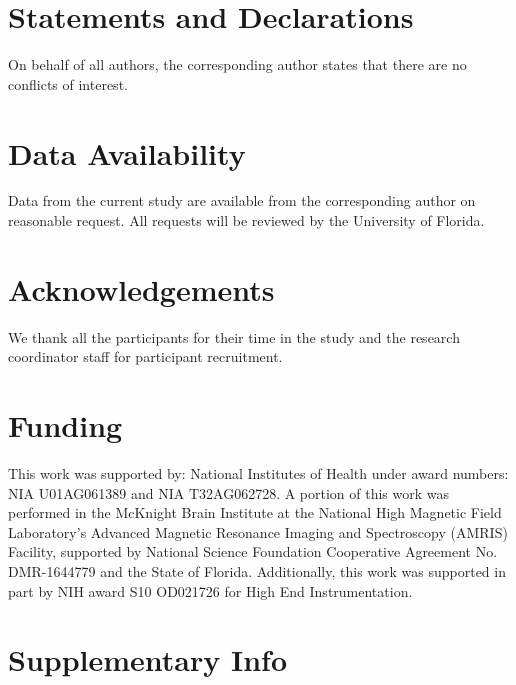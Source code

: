 \documentclass[a4paper,fleqn]{cas-sc}
\begin{document}
\clearpage
\section*{Statements and Declarations}
On behalf of all authors, the corresponding author states that there are no conflicts of interest.

\section*{Data Availability}
Data from the current study are available from the corresponding author on reasonable request. All requests will be reviewed by the University of Florida.

\section*{Acknowledgements}
We thank all the participants for their time in the study and the research coordinator staff for participant recruitment.

\section*{Funding}
This work was supported by: National Institutes of Health under award numbers: NIA U01AG061389 and NIA T32AG062728. A portion of this work was performed in the McKnight Brain Institute at the National High Magnetic Field Laboratory’s Advanced Magnetic Resonance Imaging and Spectroscopy (AMRIS) Facility, supported by National Science Foundation Cooperative Agreement No. DMR-1644779 and the State of Florida. Additionally, this work was supported in part by NIH award S10 OD021726 for High End Instrumentation.


%




\clearpage

\section{Supplementary Info}
\end{document}
